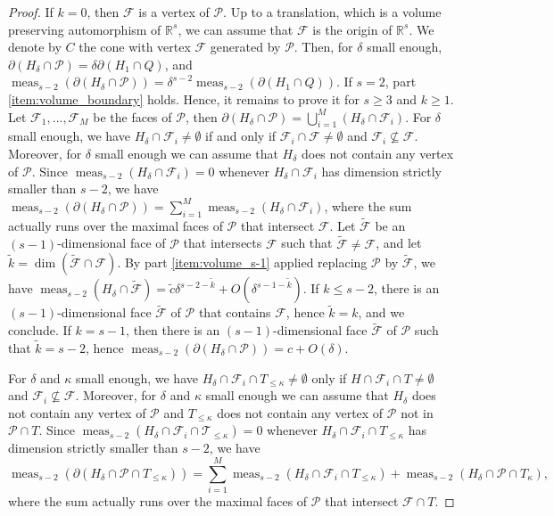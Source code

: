 \documentclass[JEP,XML,SOM,Unicode,published]{cedram}
\let\del\delta
\newcommand{\calP}{\mathcal{P}}
\newcommand\RR{\mathbb{R}}
\DeclareMathOperator{\meas}{meas}
\theoremstyle{definition}
\numberwithin{theorem}{section}
\begin{document}
\begin{proof}
If $k=0$, then $\mathcal F$ is a vertex of $\mathcal P$.
Up to a translation, which is a volume preserving automorphism of $\RR^s$,
we can assume that $\mathcal F$ is the origin of $\RR^s$.
We denote by $C$ the cone with vertex $\mathcal F$ generated by $\mathcal P$.
Then, for $\delta$ small enough,
$\partial(H_\delta\cap\mathcal P)=\delta\partial(H_1\cap Q)$,
and $\meas_{s-2}(\partial(H_\delta\cap\mathcal P))=\delta^{s-2}\meas_{s-2} (\partial(H_1\cap Q))$.
If $s=2$, part \eqref{item:volume_boundary} holds. Hence, it remains to prove it
for $s\geq3$ and $k\geq1$.
Let $\mathcal F_1,\dots,\mathcal F_M$ be the faces of $\mathcal P$,
then $\partial (H_\delta\cap\mathcal P)=\bigcup_{i=1}^M(H_\delta\cap\mathcal F_i)$.
For $\delta$ small enough, we have $H_\delta\cap\mathcal F_i\neq\emptyset$
if and only if $\mathcal F_i\cap\mathcal F\neq\emptyset$ and $\mathcal F_i\nsubseteq\mathcal F$.
Moreover, for $\delta$ small enough we can assume that $H_\delta$
does not contain any vertex of $\mathcal P$.
Since $\meas_{s-2}(H_\delta\cap\mathcal F_i)=0$ whenever $H_\delta\cap\mathcal F_i$
has dimension strictly smaller than $s-2$, we have
$\meas_{s-2}(\partial(H_\delta\cap\mathcal P))=\sum_{i=1}^M\meas_{s-2}(H_\delta\cap\mathcal F_i)$,
where the sum actually runs over the maximal faces of $\mathcal P$ that intersect $\mathcal F$.
Let $\widetilde {\mathcal F}$ be an $(s-1)$-dimensional face of $\mathcal P$ that intersects
$\mathcal F$ such that $\widetilde {\mathcal F}\neq\mathcal F$,
and let $\tilde k=\dim(\widetilde{\mathcal F}\cap\mathcal F)$.
By part \eqref{item:volume_s-1} applied replacing $\mathcal P$ by $\widetilde{\mathcal F}$, we have
$\meas_{s-2}(H_\delta\cap\widetilde{\mathcal F})
=\widetilde c \delta^{s-2-\tilde k}+O(\delta^{s-1-\widetilde k})$.
If $k\leq s-2$, there is an $(s-1)$-dimensional face $\widetilde {\mathcal F}$ of $\mathcal P$
that contains $\mathcal F$, hence $\tilde k=k$, and we conclude.
If $k=s-1$, then there is an $(s-1)$-dimensional face $\widetilde {\mathcal F}$
of $\mathcal P$ such that $\tilde k=s-2$, hence
$\meas_{s-2} (\partial(H_\delta \cap \mathcal P))= c +O(\delta)$.

For $\delta$ and $\kappa$ small enough, we have $H_{\del}\cap \mathcal F_i\cap T_{\leq\kappa}\neq\emptyset$
only if $H\cap \mathcal F_i\cap T\neq\emptyset$ and $\mathcal F_i\nsubseteq \mathcal F$.
Moreover, for $\delta$ and $\kappa$ small enough we can assume that $H_{\del}$ does not contain any
vertex of $\mathcal P$ and $T_{\leq\kappa}$ does not contain any vertex of $\mathcal P$ not in $\mathcal P\cap T$.
Since $\meas_{s-2}(H_\delta\cap\mathcal F_i \cap \mathcal T_{\leq\kappa})=0$ whenever
$H_\delta\cap\mathcal F_i\cap T_{\leq\kappa}$ has dimension strictly smaller than $s-2$, we have
\[
\meas_{s-2}(\partial (H_{\del}\cap \calP\cap T_{\leq\kappa}))
=\sum_{i=1}^M\meas_{s-2}(H_\delta\cap\mathcal F_i\cap T_{\leq\kappa})
+\meas_{s-2}(H_{\del}\cap \calP\cap T_\kappa),
\]
where the sum actually runs over the maximal faces of $\mathcal P$ that intersect $\mathcal F\cap T$.


\end{proof}
\end{document}
